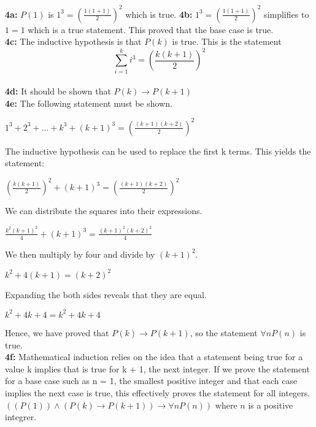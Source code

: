 \documentclass[12pt]{article}  %
\newcommand{\AND}{\wedge}
\newcommand{\IMPLIES}{\rightarrow}
\begin{document}
\noindent
{\bf 4a:}
$P(1)$ is $1^3 = (\frac{1(1 + 1)}{2})^2$ which is true.
{\bf 4b:}
$1^3 = (\frac{1(1 + 1)}{2})^2$ simplifies to $1 = 1$ which is a true statement.
This proved that the base case is true.
\\
{\bf 4c:}
The inductive hypothesis is that $P(k)$ is true. This is the statement
\[ \sum_{i=1}^{k} i^3 = (\frac{k(k + 1)}{2})^2 \]
\\
{\bf 4d:}
It should be shown that $P(k) \IMPLIES P(k+1)$
\\
{\bf 4e:}
The following statement must be shown.
\begin{center}
$1^3 + 2^3 + ... + k^3 + (k+1)^3 = (\frac{(k + 1)(k + 2)}{2})^2$
\end{center}
The inductive hypothesis can be used to replace the first k terms. This 
yields the statement:
\begin{center}
$(\frac{k(k + 1)}{2})^2 + (k + 1)^3 = (\frac{(k + 1)(k + 2)}{2})^2$
\end{center}
We can distribute the squares into their expressions.
\begin{center}
      $\frac{k^2(k + 1)^2}{4} + (k + 1)^3 = \frac{(k + 1)^2(k + 2)^2}{4}$
\end{center}
We then multiply by four and divide by $(k + 1)^2$.
\begin{center}
      $k^2 + 4(k + 1) = (k + 2)^2$
\end{center}
Expanding the both sides reveals that they are equal.
\begin{center}
      $k^2 + 4k + 4 = k^2 + 4k + 4$
\end{center}
Hence, we have proved that $P(k) \IMPLIES P(k+1)$, so the statement
$\forall n P(n)$ is true.
\\
{\bf 4f:}
Mathematical induction relies on the idea that a statement being true
for a value k implies that is true for k + 1, the next integer. If we prove
the statement for a base case such as n = 1, the smallest positive integer and 
that each case implies the next case is true, this effectively proves the statement
for all integers. $((P(1)) \AND (P(k) \IMPLIES P(k + 1)) \IMPLIES \forall n P(n))$
where $n$ is a positive integrer.
\end{document}

